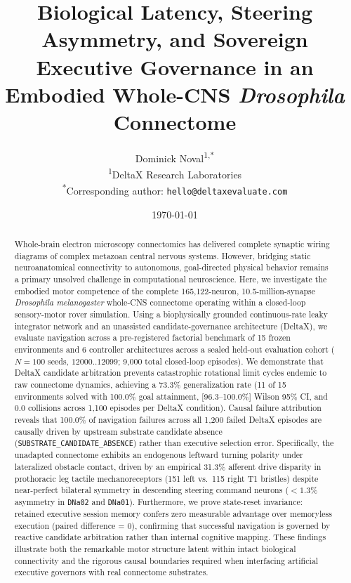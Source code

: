 \documentclass[10pt,letterpaper]{article}
\title{\textbf{Biological Latency, Steering Asymmetry, and Sovereign Executive Governance in an Embodied Whole-CNS \textit{Drosophila} Connectome}}
\author{
    Dominick Noval\textsuperscript{1,*} \\
    \small \textsuperscript{1}DeltaX Research Laboratories \\
    \small \textsuperscript{*}Corresponding author: \texttt{hello@deltaxevaluate.com}
}
\date{\today}
\begin{document}
\maketitle

\begin{abstract}
Whole-brain electron microscopy connectomics has delivered complete synaptic wiring diagrams of complex metazoan central nervous systems. However, bridging static neuroanatomical connectivity to autonomous, goal-directed physical behavior remains a primary unsolved challenge in computational neuroscience. Here, we investigate the embodied motor competence of the complete 165,122-neuron, 10.5-million-synapse \textit{Drosophila melanogaster} whole-CNS connectome operating within a closed-loop sensory-motor rover simulation. Using a biophysically grounded continuous-rate leaky integrator network and an unassisted candidate-governance architecture (DeltaX), we evaluate navigation across a pre-registered factorial benchmark of 15 frozen environments and 6 controller architectures across a sealed held-out evaluation cohort ($N = 100$ seeds, $12000..12099$; 9,000 total closed-loop episodes). We demonstrate that DeltaX candidate arbitration prevents catastrophic rotational limit cycles endemic to raw connectome dynamics, achieving a 73.3\% generalization rate (11 of 15 environments solved with 100.0\% goal attainment, [96.3--100.0\%] Wilson 95\% CI, and 0.0 collisions across 1,100 episodes per DeltaX condition). Causal failure attribution reveals that 100.0\% of navigation failures across all 1,200 failed DeltaX episodes are causally driven by upstream substrate candidate absence (\texttt{SUBSTRATE\_CANDIDATE\_ABSENCE}) rather than executive selection error. Specifically, the unadapted connectome exhibits an endogenous leftward turning polarity under lateralized obstacle contact, driven by an empirical 31.3\% afferent drive disparity in prothoracic leg tactile mechanoreceptors (151 left vs.\ 115 right T1 bristles) despite near-perfect bilateral symmetry in descending steering command neurons ($< 1.3\%$ asymmetry in \texttt{DNa02} and \texttt{DNa01}). Furthermore, we prove state-reset invariance: retained executive session memory confers zero measurable advantage over memoryless execution (paired difference = 0), confirming that successful navigation is governed by reactive candidate arbitration rather than internal cognitive mapping. These findings illustrate both the remarkable motor structure latent within intact biological connectivity and the rigorous causal boundaries required when interfacing artificial executive governors with real connectome substrates.
\end{abstract}
\end{document}
